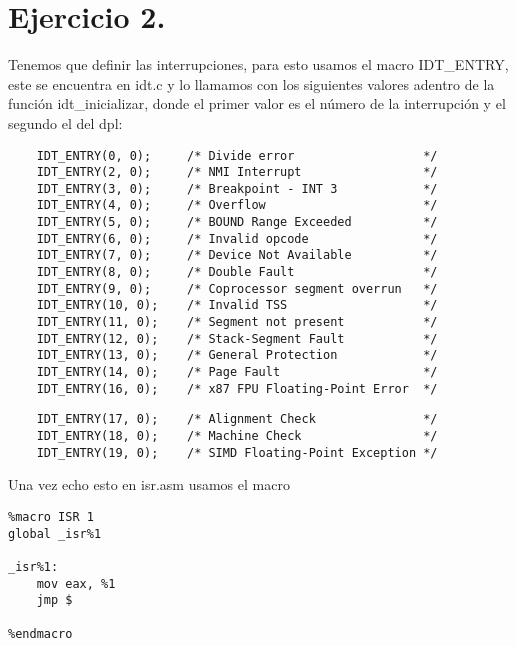 \section{Ejercicio 2.}

\noindent Tenemos que definir las interrupciones, para esto usamos el macro IDT\_ENTRY, este se encuentra en idt.c y lo llamamos con los siguientes valores adentro de la función idt\_inicializar, donde el primer valor es el número de la interrupción y el segundo el del dpl:

\begin{codesnippet}
\begin{verbatim}
    IDT_ENTRY(0, 0);     /* Divide error                  */
    IDT_ENTRY(2, 0);     /* NMI Interrupt                 */
    IDT_ENTRY(3, 0);     /* Breakpoint - INT 3            */
    IDT_ENTRY(4, 0);     /* Overflow                      */
    IDT_ENTRY(5, 0);     /* BOUND Range Exceeded          */
    IDT_ENTRY(6, 0);     /* Invalid opcode                */
    IDT_ENTRY(7, 0);     /* Device Not Available          */
    IDT_ENTRY(8, 0);     /* Double Fault                  */
    IDT_ENTRY(9, 0);     /* Coprocessor segment overrun   */
    IDT_ENTRY(10, 0);    /* Invalid TSS                   */
    IDT_ENTRY(11, 0);    /* Segment not present           */
    IDT_ENTRY(12, 0);    /* Stack-Segment Fault           */
    IDT_ENTRY(13, 0);    /* General Protection            */
    IDT_ENTRY(14, 0);    /* Page Fault                    */
    IDT_ENTRY(16, 0);    /* x87 FPU Floating-Point Error  */
    \end{verbatim}
\end{codesnippet}

\begin{codesnippet}
\begin{verbatim}
    IDT_ENTRY(17, 0);    /* Alignment Check               */
    IDT_ENTRY(18, 0);    /* Machine Check                 */
    IDT_ENTRY(19, 0);    /* SIMD Floating-Point Exception */
\end{verbatim}
\end{codesnippet}

\noindent Una vez echo esto en isr.asm usamos el macro 

\begin{codesnippet}
\begin{verbatim}
%macro ISR 1
global _isr%1

_isr%1:
    mov eax, %1
    jmp $

%endmacro
\end{verbatim}
\end{codesnippet}

